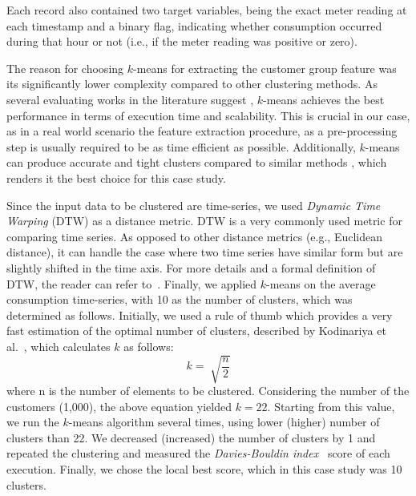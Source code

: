 Each record also contained two target variables, being the exact meter reading at each timestamp and a binary flag, indicating whether consumption occurred during that hour or not (i.e., if the meter reading was positive or zero).

The reason for choosing $k$-means for extracting the customer group feature was its significantly lower complexity compared to other clustering methods. As several evaluating works in the literature suggest \cite{singh2012performance,panda2012comparing,sehgal2014comparison}, $k$-means achieves the best performance in terms of execution time and scalability. This is crucial in our case, as in a real world scenario the feature extraction procedure, as a pre-processing step is usually required to be as time efficient as possible. Additionally, $k$-means can produce accurate and tight clusters compared to similar methods \cite{jung2014clustering}, which renders it the best choice for this case study.

Since the input data to be clustered are time-series, we used \textit{Dynamic Time Warping} (DTW) as a distance metric. DTW is a very commonly used metric for comparing time series. As opposed to other distance metrics (e.g., Euclidean distance), it can handle the case where two time series have similar form but are slightly shifted in the time axis. For more details and a formal definition of DTW, the reader can refer to~\cite{yi1998efficient}. Finally, we applied $k$-means on the average consumption time-series, with 10 as the number of clusters, which was determined as follows. Initially, we used a rule of thumb which provides a very fast estimation of the optimal number of clusters, described by Kodinariya et al.~\cite{kodinariya2013kmeans}, which calculates $k$ as follows:
\begin{equation}
	k=\sqrt[]{\frac{n}{2}}
\end{equation}
where n is the number of elements to be clustered. Considering the number of the customers (1,000), the above equation yielded $k=22$. Starting from this value, we run the $k$-means algorithm several times, using lower (higher) number of clusters than 22. We decreased (increased) the number of clusters by 1 and repeated the clustering and measured the \textit{Davies-Bouldin index}~\cite{davies1979bouldin} score of each execution. Finally, we chose the local best score, which in this case study was 10 clusters.

